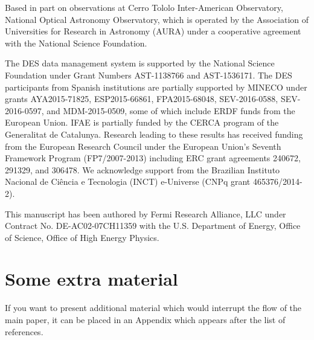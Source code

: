 \documentclass[fleqn,usenatbib,]{mnras}
\begin{document}
Based in part on observations at Cerro Tololo Inter-American Observatory, National Optical Astronomy Observatory, which is operated by the Association of 
Universities for Research in Astronomy (AURA) under a cooperative agreement with the National Science Foundation.

The DES data management system is supported by the National Science Foundation under Grant Numbers AST-1138766 and AST-1536171.
The DES participants from Spanish institutions are partially supported by MINECO under grants AYA2015-71825, ESP2015-66861, FPA2015-68048, SEV-2016-0588, SEV-2016-0597, and MDM-2015-0509, 
some of which include ERDF funds from the European Union. IFAE is partially funded by the CERCA program of the Generalitat de Catalunya.
Research leading to these results has received funding from the European Research
Council under the European Union's Seventh Framework Program (FP7/2007-2013) including ERC grant agreements 240672, 291329, and 306478.
We  acknowledge support from the Brazilian Instituto Nacional de Ci\^encia
e Tecnologia (INCT) e-Universe (CNPq grant 465376/2014-2).

This manuscript has been authored by Fermi Research Alliance, LLC under Contract No. DE-AC02-07CH11359 with the U.S. Department of Energy, Office of Science, Office of High Energy Physics.











\appendix

\section{Some extra material}

If you want to present additional material which would interrupt the flow of the main paper,
it can be placed in an Appendix which appears after the list of references.



\bsp	%
\label{lastpage}
\end{document}

